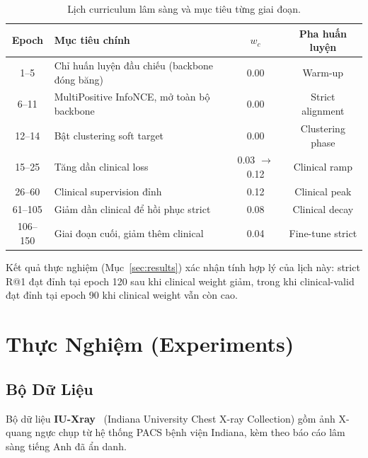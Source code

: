 \documentclass[12pt, a4paper]{article}
\begin{document}
\begin{table}[H]
  \centering
  \caption{Lịch curriculum lâm sàng và mục tiêu từng giai đoạn.}
  \label{tab:curriculum}
  \begin{tabular}{clcc}
    \toprule
    \textbf{Epoch} & \textbf{Mục tiêu chính} & \textbf{$w_c$} & \textbf{Pha huấn luyện} \\
    \midrule
    1--5   & Chỉ huấn luyện đầu chiếu (backbone đóng băng)   & 0.00 & Warm-up \\
    6--11  & MultiPositive InfoNCE, mở toàn bộ backbone       & 0.00 & Strict alignment \\
    12--14 & Bật clustering soft target                       & 0.00 & Clustering phase \\
    15--25 & Tăng dần clinical loss                           & 0.03 $\to$ 0.12 & Clinical ramp \\
    26--60 & Clinical supervision đỉnh                        & 0.12 & Clinical peak \\
    61--105& Giảm dần clinical để hồi phục strict             & 0.08 & Clinical decay \\
    106--150& Giai đoạn cuối, giảm thêm clinical              & 0.04 & Fine-tune strict \\
    \bottomrule
  \end{tabular}
\end{table}

Kết quả thực nghiệm (Mục~\ref{sec:results}) xác nhận tính hợp lý của lịch này:
strict R@1 đạt đỉnh tại epoch 120 sau khi clinical weight giảm, trong khi
clinical-valid đạt đỉnh tại epoch 90 khi clinical weight vẫn còn cao.

\section{Thực Nghiệm (Experiments)}
\label{sec:exp}

\subsection{Bộ Dữ Liệu}
\label{sec:dataset}

Bộ dữ liệu \textbf{IU-Xray}~\citep{demner2016preparing} (Indiana University
Chest X-ray Collection) gồm ảnh X-quang ngực chụp từ hệ thống PACS bệnh viện
Indiana, kèm theo báo cáo lâm sàng tiếng Anh đã ẩn danh.
\end{document}
